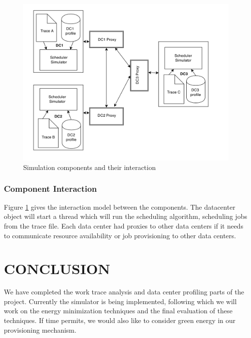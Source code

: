 \documentclass[letterpaper,twocolumn,10pt]{article}
\begin{document}
\begin{figure}[] 
\centering
\includegraphics[scale=0.40]{component}
\caption{Simulation components and their interaction}
\label{fig:component}
\end{figure}

\subsubsection{Component Interaction}
Figure \ref{fig:component} gives the interaction model between the components. The datacenter object will start a thread which will run the scheduling algorithm, scheduling jobs from the trace file. Each data center had proxies to other data centers if it needs to communicate resource availability or job provisioning to other data centers.

\section{CONCLUSION}
We have completed the work trace analysis and data center profiling parts of the project. Currently the simulator is being implemented, following which we will work on the energy minimization techniques and the final evaluation of these techniques. If time permits, we would also like to consider green energy in our provisioning mechanism. 

{\footnotesize 
}
\end{document}
